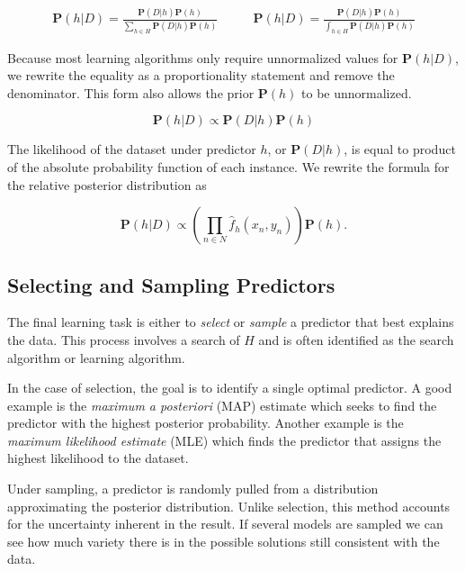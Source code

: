 \documentclass[twoside]{article}
\begin{document}
\begin{align}
\mathbf{P}(h|D)=\frac{\mathbf{P}(D|h)\mathbf{P}(h)}{\sum_{h \in H}\mathbf{P}(D|h)\mathbf{P}(h)} &
\qquad\mathbf{P}(h|D)=\frac{\mathbf{P}(D|h)\mathbf{P}(h)}{\int_{h \in H}\mathbf{P}(D|h)\mathbf{P}(h)}
\end{align}

Because most learning algorithms only require unnormalized values for \(\mathbf{P}(h|D)\), we rewrite the equality as a proportionality statement and remove the denominator. This form also allows the prior \(\mathbf{P}(h)\) to be unnormalized.

\begin{equation}
\label{eq:bayes}
\mathbf{P}(h|D)\propto\mathbf{P}(D|h)\mathbf{P}(h)
\end{equation}

The likelihood of the dataset under predictor \(h\), or \(\mathbf{P}(D|h)\), is equal to product of the absolute probability function of each instance. We rewrite the formula for the relative posterior distribution as

\begin{equation}
\label{eq:bayes_likelihood_expanded}
\mathbf{P}(h|D)\propto \left( \prod_{n \in N} \hat{f}_h(x_n,y_n) \right) \mathbf{P}(h).
\end{equation}

\subsection{Selecting and Sampling Predictors}

The final learning task is either to \textit{select} or \textit{sample} a predictor that best explains the data. This process involves a search of \(H\) and is often identified as the search algorithm or learning algorithm.

In the case of selection, the goal is to identify a single optimal predictor. A good example is the \textit{maximum a posteriori} (MAP) estimate which seeks to find the predictor with the highest posterior probability. Another example is the \textit{maximum likelihood estimate} (MLE) which finds the predictor that assigns the highest likelihood to the dataset.

Under sampling, a predictor is randomly pulled from a distribution approximating the posterior distribution. Unlike selection, this method accounts for the uncertainty inherent in the result. If several models are sampled we can see how much variety there is in the possible solutions still consistent with the data.
\end{document}
